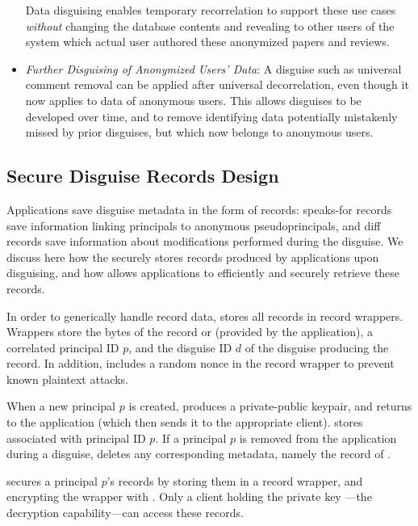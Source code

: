 \begin{itemize}
Data disguising enables temporary recorrelation to support these use cases \emph{without} changing
        the database contents and revealing to other users of the system
which actual user authored these anonymized papers and reviews.

\item \emph{Further Disguising of Anonymized Users' Data}: A disguise such as universal comment
        removal can be applied after universal decorrelation, even though it now applies to data of anonymous users.
This allows disguises to be developed over time, and to remove identifying data potentially mistakenly missed by prior
disguises, but which now belongs to anonymous users.
\end{itemize}


\subsection{Secure Disguise Records Design}
Applications save disguise metadata in the form of records: speaks-for records  save information linking
principals to anonymous pseudoprincipals, and diff records  save information about modifications
performed during the disguise.
We discuss here how the \sys securely stores records produced by applications upon disguising, and
how \sys allows applications to efficiently and securely retrieve these records.

In order to generically handle record data, \sys stores all records in record wrappers.
Wrappers store the bytes of the record  or  (provided
by the application), a correlated principal ID $p$, and the disguise ID $d$ of the disguise producing the
record. In addition, \sys includes a random nonce in the record wrapper to prevent known plaintext
attacks.

When a new principal $p$ is created, \sys produces a private-public keypair, and returns  to
the application (which then sends it to the appropriate client). \sys stores  associated
with principal ID $p$.
If a principal $p$ is removed from the application during a disguise, \sys deletes any corresponding metadata, namely
the record of .

\sys secures a principal $p$'s records by storing them in a record wrapper, and encrypting the wrapper
with . Only a client holding the private key ---the decryption
capability---can access these records.

